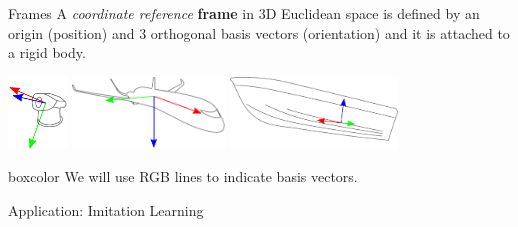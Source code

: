 \documentclass[14pt]{beamer}
\begin{document}
\begin{frame}{Frames}
A \textit{coordinate reference} \textbf{frame} in 3D Euclidean space is defined by an origin (position) and 3 orthogonal basis vectors (orientation) and it is attached to a rigid body.

\vfill

\includegraphics[height=1.9cm]{images/conventions_camera}
\includegraphics[height=1.9cm]{images/conventions_plane}
\includegraphics[height=1.9cm]{images/conventions_ship}

\vfill

\begin{beamercolorbox}[wd=\textwidth,sep=1em]{boxcolor}
We will use RGB lines to indicate basis vectors.
\end{beamercolorbox}
\end{frame}

\begin{frame}
\begin{center}
\Large
Application: Imitation Learning
\end{center}
\end{frame}
\end{document}
